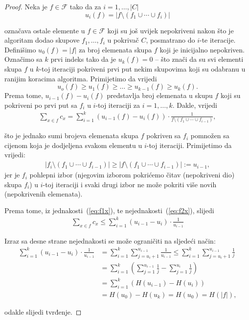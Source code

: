 \documentclass[a4paper, utf8, 11pt, colorlinks]{book}
\theoremstyle{definition}
\begin{document}
\begin{proof}
	 Neka je $f\in \mathcal{F}$ tako da za $i=1,\ldots,|C|$
	 $$u_i(f) = |f \setminus (f_1 \cup \cdots \cup f_{i} )|$$
	 
	 označava ostale elemente u $f \in \mathcal{F}$ koji su još uvijek nepokriveni nakon što je algoritam dodao skupove $f_1,\ldots, f_i$ u pokrivač $C$, posmatrano do $i$-te iteracije. Definišimo $u_0(f)=|f|$ za broj elemenata skupa $f$ koji je inicijalno nepokriven. 
	 Označimo sa $k$ prvi indeks tako da je $u_k(f)=0$  -- što znači da su svi elementi skupa $f$ u $k$-toj iteraciji
	 pokriveni prvi put nekim skupovima %
	 koji su odabranu u ranijim koracima algoritma. Primijetimo da vrijedi
	 $$ u_o(f) \geq u_1(f) \geq \ldots \geq u_{k-1}(f) \geq u_k(f).$$
	 Prema tome, $u_{i-1}(f) - u_{i}(f)$ predstavlja broj elemenata u skupu $f$ koji su pokriveni 
	 po prvi put sa $f_i$ u $i$-toj iteraciji za $i=1,\ldots,k$. Dakle, vrijedi
	 \begin{align}\label{eq:q1}
	 	\sum_{x \in f} c_x = \sum_{i=1}^k( u_{i-1}(f) - u_{i}(f)) \cdot \frac{1}{ f \setminus ( f_1 \cup \cdots \cup f_{i-1})},
	 \end{align}
 
   \noindent što je jednako sumi brojeva elemenata skupa $f$ pokriven sa $f_i$ pomnožen sa cijenom koja je dodjeljena svakom elementu u $i$-toj iteraciji. Primijetimo da vrijedi:
 \begin{align}\label{eq:q2x}
 	|f_i \setminus (f_1 \cup \cdots \cup f_{i-1})| \geq | f   \setminus (f_1 \cup \cdots \cup f_{i-1}) | := u_{i-1},
 \end{align}
 jer je $f_i$ pohlepni izbor (njegovim izborom pokrićemo čitav (nepokriveni dio) skupa $f_i$) u $i$-toj iteraciji i svaki drugi izbor ne može pokriti više novih (nepokrivenih elemenata). 
 
 Prema tome, iz jednakosti~(\ref{eq:f1x}), te nejednakosti~(\ref{eq:f2x}), slijedi 
 \begin{align*}
 	\sum_{x \in f} c_x \leq \sum_{i=1}^k ( u_{i-1} - u_{i}) \cdot \frac{1}{u_{i-1}}
 \end{align*}
 
 Izraz sa desne strane nejednakosti se može ograničiti na sljedeći način:
   \begin{align*}
 	   \sum_{i=1}^k ( u_{i-1} - u_{i}) \cdot \frac{1}{u_{i-1}} &= \sum_{i=1}^k \sum_{j=u_i + 1}^{u_{i-1}} \frac{1}{u_{i-1}} \leq \sum_{i=1}^k \sum_{j=u_i + 1}^{u_{i-1}}\frac{1}{j} \\
 	   &= \sum_{i=1}^k \left( \sum_{j=1}^{u_{i-1}}\frac{1}{j} - \sum_{j=1}^{u_{i}}\frac{1}{j} \right) \\
 	   &= \sum_{i=1}^k (H(u_{i-1}) - H(u_i)) \\
    	&= H(u_0) - H(u_k) = H(u_0) = H(|f|),
 \end{align*}
 
 odakle slijedi tvrđenje. 
 
\end{proof}
\end{document}
